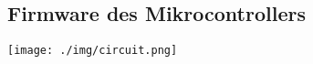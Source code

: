 \subsection{Firmware des Mikrocontrollers}
\lstset{style=C}



\begin{landscape}
\begin{center}
\texttt{[image: ./img/circuit.png]}
\end{center}
\end{landscape}